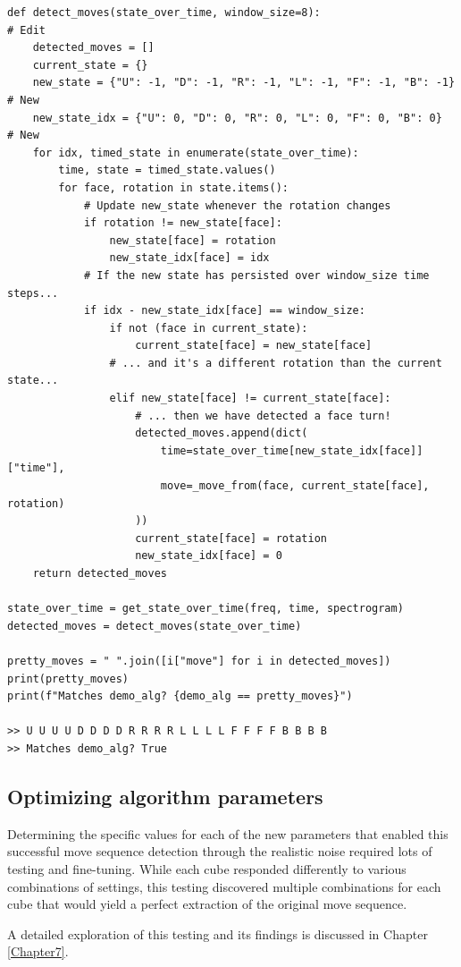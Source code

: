 \begin{verbatim}
def detect_moves(state_over_time, window_size=8):                       # Edit
    detected_moves = []
    current_state = {}
    new_state = {"U": -1, "D": -1, "R": -1, "L": -1, "F": -1, "B": -1}  # New
    new_state_idx = {"U": 0, "D": 0, "R": 0, "L": 0, "F": 0, "B": 0}    # New
    for idx, timed_state in enumerate(state_over_time):
        time, state = timed_state.values()
        for face, rotation in state.items():
            # Update new_state whenever the rotation changes
            if rotation != new_state[face]:
                new_state[face] = rotation
                new_state_idx[face] = idx
            # If the new state has persisted over window_size time steps...
            if idx - new_state_idx[face] == window_size:
                if not (face in current_state):
                    current_state[face] = new_state[face]
                # ... and it's a different rotation than the current state...
                elif new_state[face] != current_state[face]:
                    # ... then we have detected a face turn!
                    detected_moves.append(dict(
                        time=state_over_time[new_state_idx[face]]["time"],
                        move=_move_from(face, current_state[face], rotation)
                    ))
                    current_state[face] = rotation
                    new_state_idx[face] = 0
    return detected_moves

state_over_time = get_state_over_time(freq, time, spectrogram)
detected_moves = detect_moves(state_over_time)

pretty_moves = " ".join([i["move"] for i in detected_moves])
print(pretty_moves)   
print(f"Matches demo_alg? {demo_alg == pretty_moves}")

>> U U U U D D D D R R R R L L L L F F F F B B B B
>> Matches demo_alg? True
\end{verbatim}

\subsection{Optimizing algorithm parameters}
\label{subsec:optimizing-params}
Determining the specific values for each of the new parameters that enabled this successful move sequence detection through the realistic noise required lots of testing and fine-tuning.
While each cube responded differently to various combinations of settings, this testing discovered multiple combinations for each cube that would yield a perfect extraction of the original move sequence.

A detailed exploration of this testing and its findings is discussed in Chapter \ref{Chapter7}.
